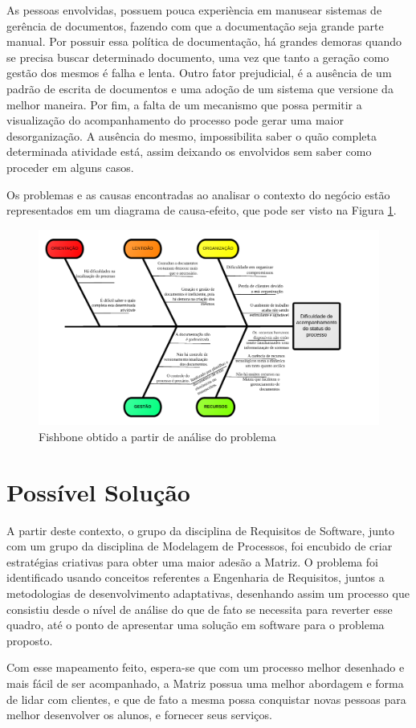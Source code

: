 As pessoas envolvidas, possuem pouca experiència em manusear 
sistemas de gerência de documentos, fazendo com que a documentação seja grande parte manual. Por 
possuir essa política de documentação, há grandes demoras quando se precisa buscar determinado 
documento, uma vez que tanto a geração como gestão dos mesmos é falha e lenta. Outro fator prejudicial, 
é a ausência de um padrão de escrita de documentos e uma adoção de um sistema que versione da melhor 
maneira. Por fim, a falta de um mecanismo que possa permitir a visualização do acompanhamento do processo
pode gerar uma maior desorganização. A ausência do mesmo, impossibilita saber o quão completa 
determinada atividade está, assim deixando os envolvidos sem saber como proceder
em alguns casos.

Os problemas e as causas encontradas ao analisar o contexto do negócio estão representados em 
um diagrama de causa-efeito, que pode ser visto na Figura \ref{fishbone}.
\begin{figure}[!htb]
\centering
\includegraphics[scale=0.6]{figuras/fish.png}
\caption{Fishbone obtido a partir de análise do problema}
\label{fishbone}
\end{figure}
\section{Possível Solução}
A partir deste contexto, o grupo da disciplina de Requisitos de Software, junto com um 
grupo da disciplina de Modelagem de Processos, foi encubido de criar estratégias 
criativas para obter uma maior adesão a Matriz. O problema foi identificado
usando conceitos referentes a Engenharia de Requisitos, juntos a metodologias de 
desenvolvimento adaptativas, desenhando assim um processo que consistiu desde o nível 
de análise do que de fato se necessita para reverter esse quadro, até o ponto de 
apresentar uma solução em software para o problema proposto.

Com esse mapeamento feito, espera-se que com um processo melhor desenhado e mais fácil de ser
acompanhado, a Matriz possua uma melhor abordagem e forma de lidar com clientes, e que de fato
a mesma possa conquistar novas pessoas para melhor desenvolver os alunos, e fornecer seus serviços.
